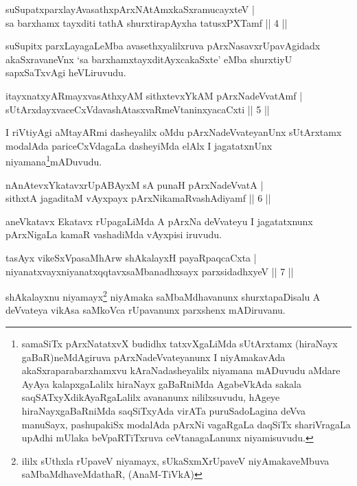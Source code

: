 \begin{shl}
suSupatxparxlayAvasathxpArxNAtAmx\s kaSxramucayxteV |\\
sa barxhamx tayxditi tathA shurxtirapAyxha tatusxPXTamf \hfill || 4 ||
\end{shl}

\begin{artha}
suSupitx parxLayagaLeMba avasethxyalilxruva pArxNasavxrUpavAgidadx akaSxravaneVnx `sa barxhamxtayxditAyxcakaSxte' eMba shurxtiyU sapxSaTxvAgi heVLiruvudu.
\end{artha}%

\begin{shl}
itayxnatxyARmayxvasAthxyAM sithxtevxYkAM pArxNadeVvatAmf |\\
sUtArxdayxvaceCxVdavashAtasxvaRmeVtaninxyacaCxti \hfill || 5 ||
\end{shl}

\begin{artha}
I riVtiyAgi aMtayARmi dasheyalilx oMdu pArxNadeVvateyanUnx \-sUtArxtamx modalAda pariceCxVdagaLa dasheyiMda elAlx I jagatatxnUnx niyamana\footnote[1]{samaSiTx pArxNatatxvX budidhx tatxvXgaLiMda sUtArxtamx (hiraNayx gaBaR)neMdAgiruva pArxNadeVvateyanunx I niyAmakavAda akaSxraparabarxhamxvu kAraNadasheyalilx niyamana mADuvudu aMdare AyAya kalapxgaLalilx hiraNayx gaBaRniMda AgabeVkAda sakala saqSATxyXdikAyaRgaLalilx avananunx nililxsuvudu, hAgeye hiraNayxgaBaRniMda saqSiTxyAda virATa puruSadoLagina deVva manuSayx, pashupakiSx modalAda pArxNi vagaRgaLa daqSiTx shariVragaLa upAdhi mUlaka beVpaRTiTxruva ceVtanagaLanunx niyamisuvudu.}mADuvudu.
\end{artha}

\begin{shl}
nAnAtevxYkatavxrUpABAyxM sA punaH pArxNadeVvatA |\\
sithxtA jagaditaM vAyxpayx pArxNikamaRvashAdiyamf \hfill || 6 ||
\end{shl}

\begin{artha}
aneVkatavx Ekatavx rUpagaLiMda A pArxNa deVvateyu I jagatatxnunx pArxNigaLa kamaR vashadiMda vAyxpisi iruvudu.
\end{artha}

\begin{shl}
tasAyx vikeSxVpasaMhArw shAkalayxH payaRpaqcaCxta |\\
niyanatxvayxniyanatxqqtavxsaMbanadhxsayx parxsidadhxyeV \hfill || 7 ||
\end{shl}

\begin{artha}
shAkalayxnu niyamayx\footnote[2]{ililx sUthxla rUpaveV niyamayx, sUkaSxmXrUpaveV niyAmakaveMbuva saMbaMdhaveMdathaR, (AnaM-TiVkA)} niyAmaka saMbaMdhavanunx shurxtapaDisalu A deVvateya vikAsa saMkoVca rUpavanunx parxshenx mADiruvanu.
\end{artha}

